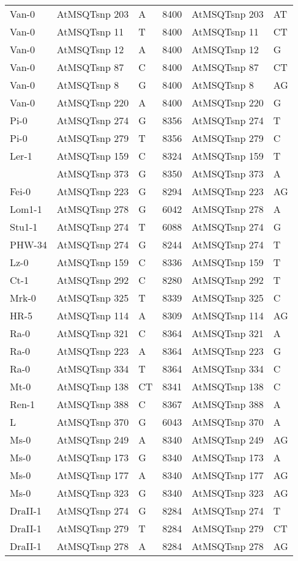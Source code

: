 \begin{center}
\begin{longtable}{|l|l|l|l|l|l|}
Van-0&AtMSQTsnp 203&A&8400&AtMSQTsnp 203&AT\\
Van-0&AtMSQTsnp 11&T&8400&AtMSQTsnp 11&CT\\
Van-0&AtMSQTsnp 12&A&8400&AtMSQTsnp 12&G\\
Van-0&AtMSQTsnp 87&C&8400&AtMSQTsnp 87&CT\\
Van-0&AtMSQTsnp 8&G&8400&AtMSQTsnp 8&AG\\
Van-0&AtMSQTsnp 220&A&8400&AtMSQTsnp 220&G\\
Pi-0&AtMSQTsnp 274&G&8356&AtMSQTsnp 274&T\\
Pi-0&AtMSQTsnp 279&T&8356&AtMSQTsnp 279&C\\
Ler-1&AtMSQTsnp 159&C&8324&AtMSQTsnp 159&T\\
&AtMSQTsnp 373&G&8350&AtMSQTsnp 373&A\\
Fei-0&AtMSQTsnp 223&G&8294&AtMSQTsnp 223&AG\\
Lom1-1&AtMSQTsnp 278&G&6042&AtMSQTsnp 278&A\\
Stu1-1&AtMSQTsnp 274&T&6088&AtMSQTsnp 274&G\\
PHW-34&AtMSQTsnp 274&G&8244&AtMSQTsnp 274&T\\
Lz-0&AtMSQTsnp 159&C&8336&AtMSQTsnp 159&T\\
Ct-1&AtMSQTsnp 292&C&8280&AtMSQTsnp 292&T\\
Mrk-0&AtMSQTsnp 325&T&8339&AtMSQTsnp 325&C\\
HR-5&AtMSQTsnp 114&A&8309&AtMSQTsnp 114&AG\\
Ra-0&AtMSQTsnp 321&C&8364&AtMSQTsnp 321&A\\
Ra-0&AtMSQTsnp 223&A&8364&AtMSQTsnp 223&G\\
Ra-0&AtMSQTsnp 334&T&8364&AtMSQTsnp 334&C\\
Mt-0&AtMSQTsnp 138&CT&8341&AtMSQTsnp 138&C\\
Ren-1&AtMSQTsnp 388&C&8367&AtMSQTsnp 388&A\\
L&AtMSQTsnp 370&G&6043&AtMSQTsnp 370&A\\
Ms-0&AtMSQTsnp 249&A&8340&AtMSQTsnp 249&AG\\
Ms-0&AtMSQTsnp 173&G&8340&AtMSQTsnp 173&A\\
Ms-0&AtMSQTsnp 177&A&8340&AtMSQTsnp 177&AG\\
Ms-0&AtMSQTsnp 323&G&8340&AtMSQTsnp 323&AG\\
DraII-1&AtMSQTsnp 274&G&8284&AtMSQTsnp 274&T\\
DraII-1&AtMSQTsnp 279&T&8284&AtMSQTsnp 279&CT\\
DraII-1&AtMSQTsnp 278&A&8284&AtMSQTsnp 278&AG\\

\end{longtable}
\end{center}
